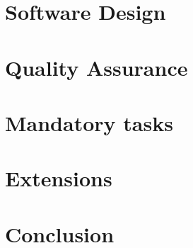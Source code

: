 

	
	\frontmatter
		
	\newpage	
	\tableofcontents 

	
	\mainmatter
	
	\chapter{Software Design}
	
	
	\chapter{Quality Assurance}
	
	 
	
	\chapter{Mandatory tasks}
	
	
	
	
	
	\chapter{Extensions}
	
	
	
	\chapter{Conclusion}
	
	
	\backmatter
	

